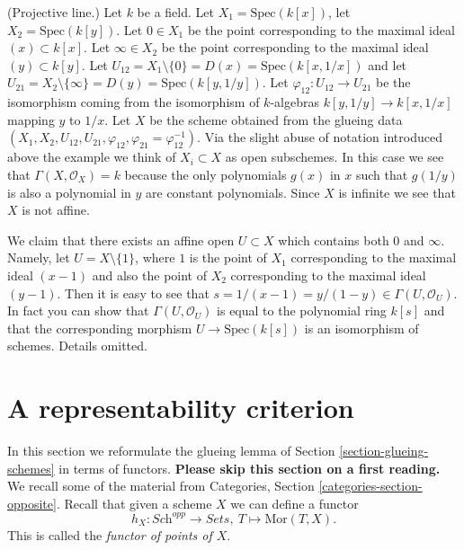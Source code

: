 \begin{example}
\label{example-projective-line}
(Projective line.)
Let $k$ be a field.
Let $X_1 = \text{Spec}(k[x])$,
let $X_2 = \text{Spec}(k[y])$.
Let $0 \in X_1$ be the point corresponding to the maximal ideal
$(x) \subset k[x]$.
Let $\infty \in X_2$ be the point corresponding to the maximal ideal
$(y) \subset k[y]$.
Let $U_{12} = X_1 \setminus \{0\} = D(x) = \text{Spec}(k[x, 1/x])$ and
let $U_{21} = X_2 \setminus \{\infty\} = D(y) = \text{Spec}(k[y, 1/y])$.
Let $\varphi_{12} : U_{12} \to U_{21}$ be the isomorphism
coming from the isomorphism of $k$-algebras
$k[y, 1/y] \to k[x, 1/x]$ mapping $y$ to $1/x$.
Let $X$ be the scheme obtained from the glueing data
$(X_1, X_2, U_{12}, U_{21}, \varphi_{12},
\varphi_{21} = \varphi_{12}^{-1})$. Via the slight abuse
of notation introduced above the example we think of
$X_i \subset X$ as open subschemes. In this case
we see that $\Gamma(X, \mathcal{O}_X) = k$ because the
only polynomials $g(x)$ in $x$ such that $g(1/y)$ is
also a polynomial in $y$ are constant polynomials.
Since $X$ is infinite we see that $X$ is not affine.

\medskip\noindent
We claim that there exists an affine open $U \subset X$
which contains both $0$ and $\infty$. Namely, let
$U = X \setminus \{1\}$, where $1$ is the point
of $X_1$ corresponding to the maximal ideal $(x - 1)$
and also the point of $X_2$ corresponding to the
maximal ideal $(y - 1)$. Then it is easy to see that
$s = 1/(x - 1) = y/(1 - y) \in \Gamma(U, \mathcal{O}_U)$.
In fact you can show that $\Gamma(U, \mathcal{O}_U)$
is equal to the polynomial ring $k[s]$ and that the
corresponding morphism $U \to \text{Spec}(k[s])$ is
an isomorphism of schemes. Details omitted.
\end{example}




\section{A representability criterion}
\label{section-representable}

\noindent
In this section we reformulate the glueing lemma
of Section \ref{section-glueing-schemes} in terms
of functors. {\bf Please skip this section on
a first reading.}
We recall some of the material from
Categories, Section \ref{categories-section-opposite}.
Recall that given a scheme $X$ we
can define a functor
$$
h_X : \textit{Sch}^{opp}
\longrightarrow
\textit{Sets},\ 
T \longmapsto \text{Mor}(T, X).
$$
This is called the {\it functor of points of $X$}.

